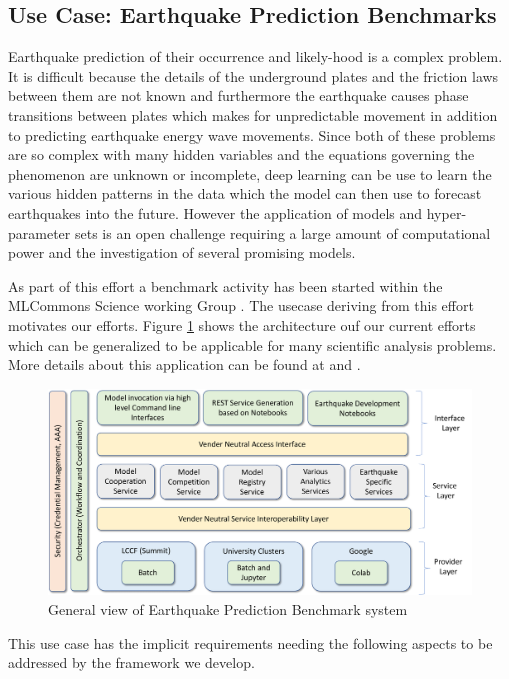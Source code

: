 \subsection{Use Case: Earthquake Prediction Benchmarks}


Earthquake prediction of their occurrence and likely-hood is a complex problem. 
It is difficult because the details of
the underground plates and the friction laws between them are not
known and furthermore the earthquake causes phase transitions between
plates which makes for unpredictable movement in addition to 
predicting earthquake energy wave movements. 
Since both of these problems
are so complex with many hidden variables and the equations governing
the phenomenon are unknown or incomplete, deep learning can be use to
learn the various hidden patterns in the data which the model can then
use to forecast earthquakes into the future. \cite{fox2021earthquake}
However the application of models and hyper-parameter sets is an open challenge requiring a large amount of computational power and the investigation of several promising models.

As part of this effort a benchmark activity has been started within the MLCommons Science working Group \cite{?}. The usecase deriving from this effort motivates our efforts. Figure \ref{fig:eq-general} shows the architecture ouf our current efforts which can be generalized to be applicable for many scientific analysis problems. More details about this application can be found at \cite{??} and \cite{??}.


\begin{figure}[htb]
\centering\includegraphics[width=1.0\columnwidth]{images/nist-eq-arch.pdf}
\caption{General view of Earthquake Prediction Benchmark system}
\label{fig:eq-general}
\end{figure}

This use case has the implicit requirements needing the following
aspects to be addressed by the framework we develop.

